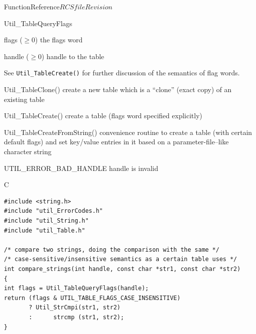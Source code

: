 \begin{cactuspart}{FunctionReference}{$RCSfile$}{$Revision$}
\begin{FunctionDescription}{Util\_TableQueryFlags}
\begin{ResultSection}
\begin{Result}{flags ($\ge 0$)}
the flags word
\end{Result}
\end{ResultSection}

\begin{ParameterSection}
\begin{Parameter}{handle ($\ge 0$)}
handle to the table
\end{Parameter}
\end{ParameterSection}

\begin{Discussion}
See \verb|Util_TableCreate()| for further discussion of the semantics
of flag words.
\end{Discussion}

\begin{SeeAlsoSection}
\begin{SeeAlso}{Util\_TableClone()}
create a new table which is a ``clone'' (exact copy) of an existing
table
\end{SeeAlso}
\begin{SeeAlso}{Util\_TableCreate()}
create a table (flags word specified explicitly)
\end{SeeAlso}
\begin{SeeAlso}{Util\_TableCreateFromString()}
convenience routine to create a table (with certain default flags)
and set key/value entries in it based on a parameter-file--like
character string
\end{SeeAlso}
\end{SeeAlsoSection}

\begin{ErrorSection}
\begin{Error}{UTIL\_ERROR\_BAD\_HANDLE}
handle is invalid
\end{Error}
\end{ErrorSection}

\begin{ExampleSection}
\begin{Example}{C}
\begin{verbatim}
#include <string.h>
#include "util_ErrorCodes.h"
#include "util_String.h"
#include "util_Table.h"

/* compare two strings, doing the comparison with the same */
/* case-sensitive/insensitive semantics as a certain table uses */
int compare_strings(int handle, const char *str1, const char *str2)
{
int flags = Util_TableQueryFlags(handle);
return (flags & UTIL_TABLE_FLAGS_CASE_INSENSITIVE)
       ? Util_StrCmpi(str1, str2)
       :      strcmp (str1, str2);
}
\end{verbatim}
\end{Example}
\end{ExampleSection}
\end{FunctionDescription}


\end{cactuspart}
